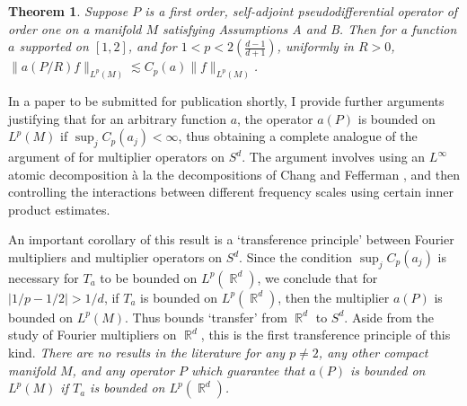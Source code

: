 \documentclass[11pt]{article}
\newtheorem*{theorem}{Theorem}
\DeclareMathOperator{\RR}{\mathbb{R}}
\begin{document}
\begin{theorem} \cite{DensonCharacterization}
	Suppose $P$ is a first order, self-adjoint pseudodifferential operator of order one on a manifold $M$ satisfying Assumptions A and B. Then for a function $a$ supported on $[1,2]$, and for $1 < p < 2 ({\scriptstyle \frac{d-1}{d+1}})$, uniformly in $R > 0$, $\| a(P/R) f \|_{L^p(M)} \lesssim C_p(a) \| f \|_{L^p(M)}$.
\end{theorem}

In a paper to be submitted for publication shortly, I provide further arguments justifying that for an arbitrary function $a$, the operator $a(P)$ is bounded on $L^p(M)$ if $\sup_j C_p(a_j) < \infty$, thus obtaining a complete analogue of the argument of \cite{HeoNazarovSeeger} for multiplier operators on $S^d$. The argument involves using an $L^\infty$ atomic decomposition à la the decompositions of Chang and Fefferman \cite{ChangFefferman}, and then controlling the interactions between different frequency scales using certain inner product estimates. %

An important corollary of this result is a `transference principle' between Fourier multipliers and multiplier operators on $S^d$. Since the condition $\sup_j C_p(a_j)$ is necessary for $T_a$ to be bounded on $L^p(\RR^d)$, we conclude that for $|1/p - 1/2| > 1/d$, if $T_a$ is bounded on $L^p(\RR^d)$, then the multiplier $a(P)$ is bounded on $L^p(M)$. Thus bounds `transfer' from $\RR^d$ to $S^d$. Aside from the study of Fourier multipliers on $\RR^d$, this is the first transference principle of this kind. \emph{There are no results in the literature for any $p \neq 2$, any other compact manifold $M$, and any operator $P$ which guarantee that $a(P)$ is bounded on $L^p(M)$ if $T_a$ is bounded on $L^p(\RR^d)$.}
\end{document}
